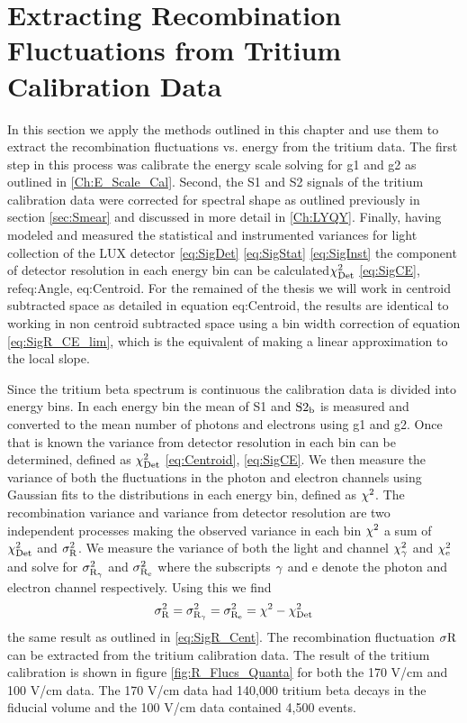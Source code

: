 \section{Extracting Recombination Fluctuations from Tritium Calibration Data}

In this section we apply the methods outlined in this chapter and use them to extract the recombination fluctuations vs. energy from the tritium data. The first step in this process was calibrate the energy scale solving for g1 and g2 as outlined in \ref{Ch:E_Scale_Cal}. Second, the S1 and S2 signals of the tritium calibration data were corrected for spectral shape as outlined previously in section \ref{sec:Smear} and discussed in more detail in \ref{Ch:LYQY}. Finally, having modeled and measured the statistical and instrumented variances for light collection of the LUX detector \ref{eq:SigDet} \ref{eq:SigStat} \ref{eq:SigInst} the component of detector resolution in each energy bin can be calculated$\rm \chi_{Det}^2$ \ref{eq:SigCE}, ref{eq:Angle}, {eq:Centroid}. For the remained of the thesis we will work in centroid subtracted space as detailed in equation {eq:Centroid}, the results are identical to working in non centroid subtracted space using a bin width correction of equation \ref{eq:SigR_CE_lim}, which is the equivalent of making a linear approximation to the local slope.  


Since the tritium beta spectrum is continuous the calibration data is divided into energy bins. In each energy bin the mean of S1 and $\rm S2_b$ is measured and converted to the mean number of photons and electrons using g1 and g2. Once that is known the variance from detector resolution in each bin can be determined, defined as $\rm \chi_{Det}^2$ \ref{eq:Centroid}, \ref{eq:SigCE}. We then measure the variance of both the fluctuations in the photon and electron channels using Gaussian fits to the distributions in each energy bin, defined as $\rm \chi^2$. The recombination variance and variance from detector resolution are two independent processes making the observed variance in each bin $\rm \chi^2$ a sum of $\rm \chi_{Det}^2$ and $\rm \sigma_R^2$. We measure the variance of both the light and channel $\rm \chi_{\gamma}^2$ and $\rm \chi_e^2$ and solve for $\rm \sigma_{R_\gamma}^2$ and $\rm \sigma_{R_e}^2$ where the subscripts $\rm \gamma$ and e denote the photon and electron channel respectively. Using this we find
\begin{equation}
\rm \sigma_R^2 = \sigma_{R_\gamma}^2 = \sigma_{R_e}^2 = \chi^2-\chi_{Det}^2
\end{equation}
\noindent the same result as outlined in \ref{eq:SigR_Cent}. The recombination fluctuation $\rm \sigma R$ can be extracted from the tritium calibration data. The result of the tritium calibration is shown in figure \ref{fig:R_Flucs_Quanta} for both the 170 V/cm and 100 V/cm data. The 170 V/cm data had 140,000 tritium beta decays in the fiducial volume and the 100 V/cm data contained 4,500 events. 



